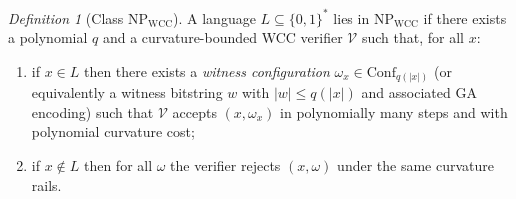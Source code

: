 \documentclass[12pt]{article}
\theoremstyle{remark}
\newtheorem{definition}[theorem]{Definition}
\begin{document}
\begin{definition}[Class $\mathrm{NP}_{\mathrm{WCC}}$]
A language $L\subseteq\{0,1\}^*$ lies in $\mathrm{NP}_{\mathrm{WCC}}$
if there exists a polynomial $q$ and a curvature-bounded WCC verifier
$\mathcal{V}$ such that, for all $x$:
\begin{enumerate}
    \item if $x\in L$ then there exists a \emph{witness configuration}
          $\omega_x \in \mathrm{Conf}_{q(|x|)}$ (or equivalently a
          witness bitstring $w$ with $|w|\le q(|x|)$ and associated
          GA encoding) such that $\mathcal{V}$ accepts $(x,\omega_x)$
          in polynomially many steps and with polynomial curvature
          cost;
    \item if $x\notin L$ then for all $\omega$ the verifier
          rejects $(x,\omega)$ under the same curvature rails.
\end{enumerate}
\end{definition}
\end{document}
